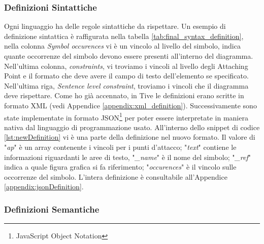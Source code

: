             \subsubsection{Definizioni Sintattiche}
                Ogni linguaggio ha delle regole sintattiche da rispettare. Un esempio di definizione sintattica è raffigurata nella tabella \ref{tab:final_syntax_definition}, nella colonna \textit{Symbol occurences} vi è un vincolo al livello del simbolo, indica quante occorrenze del simbolo devono essere presenti all'interno del diagramma. Nell'ultima colonna, \textit{constraints}, vi troviamo i vincoli al livello degli Attaching Point e il formato che deve avere il campo di testo dell'elemento se specificato. Nell'ultima riga, \textit{Sentence level constraint}, troviamo i vincoli che il diagramma deve rispettare.
                \newline
                Come ho già accennato, in Tive le definizioni erano scritte in formato XML (vedi Appendice \ref{appendix:xml_definition}). Successivamente sono state implementate in formato JSON\footnote{JavaScript Object Notation} per poter essere interpretate in maniera nativa dal linguaggio di programmazione usato. All'interno dello snippet di codice \ref{lst:newDefinition} vi è una parte della definizione nel nuovo formato. 
                \newline
                Il valore di "\textit{ap}" è un array contenente i vincoli per i punti d'attacco; "\textit{text}" contiene le informazioni riguardanti le aree di testo, "\textit{\_name}" è il nome del simbolo; "\textit{\_ref}" indica a quale figura grafica si fa riferimento; "\textit{occurences}" è il vincolo sulle occorrenze del simbolo.
                \newline
                L'intera definizione è consultabile all'Appendice \ref{appendix:jsonDefinition}.
                \newpage
                \begin{spacing}{0.5}
                    
                \end{spacing}

            \subsubsection{Definizioni Semantiche}
            
